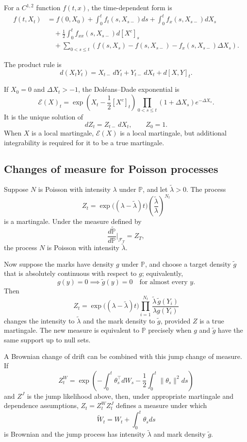 For a $C^{1,2}$ function $f(t,x)$, the time-dependent form is
\[
\begin{aligned}
f(t,X_t)
&=f(0,X_0)
 +\int_0^tf_t(s,X_{s-})ds
 +\int_0^tf_x(s,X_{s-})dX_s\\
&\quad+\frac12\int_0^tf_{xx}(s,X_{s-})d[X^c]_s\\
&\quad+\sum_{0<s\leq t}
 \left(
 f(s,X_s)-f(s,X_{s-})
 -f_x(s,X_{s-})\Delta X_s
 \right).
\end{aligned}
\]

The product rule is
\[
d(X_tY_t)
=X_{t-}\,dY_t+Y_{t-}\,dX_t+d[X,Y]_t.
\]

If $X_0=0$ and $\Delta X_t>-1$, the Dol\'eans--Dade exponential is
\[
\mathcal{E}(X)_t
=\exp\!\left(X_t-\frac12[X^c]_t\right)
 \prod_{0<s\leq t}(1+\Delta X_s)e^{-\Delta X_s}.
\]
It is the unique solution of
\[
dZ_t=Z_{t-}\,dX_t,
\qquad Z_0=1.
\]
When $X$ is a local martingale, $\mathcal{E}(X)$ is a local martingale, but additional integrability is required for it to be a true martingale.

\subsection{Changes of measure for Poisson processes}

Suppose $N$ is Poisson with intensity $\lambda$ under $\mathbb{P}$, and let $\widetilde\lambda>0$. The process
\[
Z_t
=\exp\!\bigl((\lambda-\widetilde\lambda)t\bigr)
 \left(\frac{\widetilde\lambda}{\lambda}\right)^{N_t}
\]
is a martingale. Under the measure defined by
\[
\frac{d\widetilde{\mathbb{P}}}{d\mathbb{P}}
\bigg|_{\mathcal{F}_T}=Z_T,
\]
the process $N$ is Poisson with intensity $\widetilde\lambda$.

Now suppose the marks have density $g$ under $\mathbb{P}$, and choose a target density $\widetilde g$ that is absolutely continuous with respect to $g$; equivalently,
\[
g(y)=0\implies\widetilde g(y)=0
\quad\text{for almost every }y.
\]
Then
\[
Z_t
=\exp\!\bigl((\lambda-\widetilde\lambda)t\bigr)
 \prod_{i=1}^{N_t}
 \frac{\widetilde\lambda\,\widetilde g(Y_i)}
      {\lambda g(Y_i)}
\]
changes the intensity to $\widetilde\lambda$ and the mark density to $\widetilde g$, provided $Z$ is a true martingale. The new measure is equivalent to $\mathbb{P}$ precisely when $g$ and $\widetilde g$ have the same support up to null sets.

A Brownian change of drift can be combined with this jump change of measure. If
\[
Z_t^{W}
=\exp\!\left(
 -\int_0^t\theta_s^\top dW_s
 -\frac12\int_0^t\|\theta_s\|^2ds
\right)
\]
and $Z^J$ is the jump likelihood above, then, under appropriate martingale and dependence assumptions, $Z_t=Z_t^WZ_t^J$ defines a measure under which
\[
\widetilde W_t=W_t+\int_0^t\theta_sds
\]
is Brownian and the jump process has intensity $\widetilde\lambda$ and mark density $\widetilde g$.

